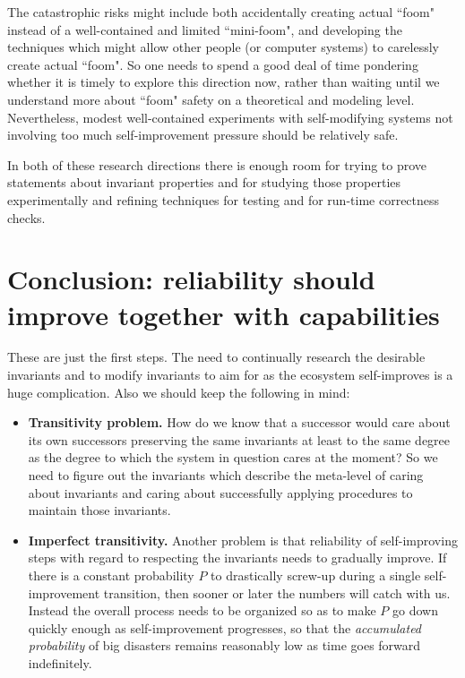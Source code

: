\documentclass{article}
\begin{document}
The catastrophic risks might include both accidentally creating actual ``foom" instead of a well-contained and
limited ``mini-foom", and developing the techniques which might allow other people (or computer systems) to
carelessly create actual ``foom". So one needs to spend a good deal of time pondering whether it is
timely to explore this direction now, rather than waiting until we understand more about 
``foom" safety on a theoretical and modeling level. Nevertheless, modest well-contained experiments 
with self-modifying systems not involving too much self-improvement pressure should be relatively safe.

In both of these research directions there is enough room for trying to prove statements
about invariant properties and for studying those properties experimentally and refining techniques for
testing and for run-time correctness checks.

\section{Conclusion: reliability should improve together with capabilities}\label{sec:conclusion}

These are just the first steps. The need to continually research the desirable invariants and to modify invariants
to aim for as the ecosystem self-improves is a huge complication. Also we should keep the following in mind:

\begin{itemize}

\item {\bf Transitivity problem.} How do we know that a successor would care about its own successors
preserving the same invariants at least to the same degree as the degree to which the system in question cares at the moment?
So we need to figure out the invariants which describe the meta-level of caring about invariants and caring about successfully
applying procedures to maintain those invariants.

\item {\bf Imperfect transitivity.} Another problem is that reliability of self-improving steps with regard to respecting the
invariants needs to gradually improve. If there is a constant probability $P$ to drastically screw-up during
a single self-improvement transition, then sooner or later the numbers will catch with us. Instead the overall
process needs to be organized so as to make $P$ go down quickly enough as self-improvement progresses,
so that the {\em accumulated probability} of big disasters remains reasonably low as time goes forward
indefinitely. 

\end{itemize}
\end{document}
